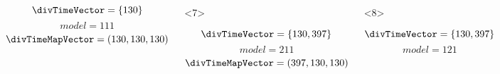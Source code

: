 \begin{frame}
\begin{columns}[t]
\begin{onlyenv}
\begin{minipage}[c][0.5\textheight][c]{\linewidth}
\begin{displaybox}[0.95\linewidth]
                    \begin{minipage}[c][0.45\textheight][c]{0.95\linewidth}
                        \[
                            \divTimeVector = \{130\}
                        \]\vspace{0mm}
                        \[
                            model = 111
                        \]\vspace{0mm}
                        \[
                            \divTimeMapVector = (130,130,130)
                        \]\vspace{0mm}
                    \end{minipage}
                \end{displaybox}
            \end{minipage}
        \end{onlyenv}
        \begin{onlyenv}<7>
            \begin{minipage}[c][0.5\textheight][c]{\linewidth}
                \begin{displaybox}[0.95\linewidth]
                    \begin{minipage}[c][0.45\textheight][c]{0.95\linewidth}
                        \[
                            \divTimeVector = \{130,397\}
                        \]\vspace{0mm}
                        \[
                            model = 211
                        \]\vspace{0mm}
                        \[
                            \divTimeMapVector = (397,130,130)
                        \]\vspace{0mm}
                    \end{minipage}
                \end{displaybox}
            \end{minipage}
        \end{onlyenv}
        \begin{onlyenv}<8>
            \begin{minipage}[c][0.5\textheight][c]{\linewidth}
                \begin{displaybox}[0.95\linewidth]
                    \begin{minipage}[c][0.45\textheight][c]{0.95\linewidth}
                        \[
                            \divTimeVector = \{130,397\}
                        \]\vspace{0mm}
                        \[
                            model = 121
\]
\end{minipage}
\end{displaybox}
\end{minipage}
\end{onlyenv}
\end{columns}
\end{frame}
